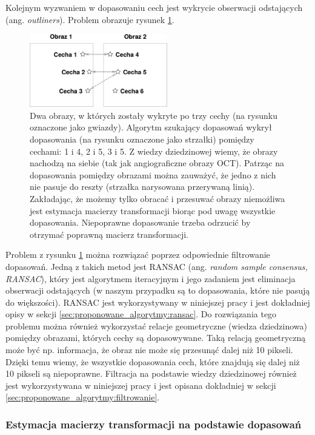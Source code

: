 Kolejnym wyzwaniem w dopasowaniu cech jest wykrycie obserwacji odstających (ang. \textit{outliners}). Problem obrazuje rysunek \ref{fig:algorytmy_korejestracji:outliners}.

\begin{figure}[H]
  \centering
  \includegraphics[width=6cm]{gfx/match}
  \caption{Dwa obrazy, w których zostały wykryte po trzy cechy (na rysunku oznaczone jako gwiazdy). Algorytm szukający dopasowań wykrył dopasowania (na rysunku oznaczone jako strzałki) pomiędzy cechami: 1 i 4, 2 i 5, 3 i 5. Z wiedzy dziedzinowej wiemy, że obrazy nachodzą na siebie (tak jak angiograficzne obrazy OCT). Patrząc na dopasowania pomiędzy obrazami można zauważyć, że jedno z nich nie pasuje do reszty (strzałka narysowana przerywaną linią). Zakładając, że możemy tylko obracać i przesuwać obrazy niemożliwa jest estymacja macierzy transformacji biorąc pod uwagę wszystkie dopasowania. Niepoprawne dopasowanie trzeba odrzucić by otrzymać poprawną macierz transformacji.}
  \label{fig:algorytmy_korejestracji:outliners}
\end{figure}

Problem z rysunku \ref{fig:algorytmy_korejestracji:outliners} można rozwiązać poprzez odpowiednie filtrowanie dopasowań. Jedną z takich metod jest RANSAC (ang. \textit{random sample consensus, RANSAC}), który jest algorytmem iteracyjnym i jego zadaniem jest eliminacja obserwacji odstających (w naszym przypadku są to dopasowania, które nie pasują do większości). RANSAC jest wykorzystywany w niniejszej pracy i jest dokładniej opisy w sekcji \ref{sec:proponowane_algorytmy:ransac}. Do rozwiązania tego problemu można również wykorzystać relacje geometryczne (wiedza dziedzinowa) pomiędzy obrazami, których cechy są dopasowywane. Taką relacją geometryczną może być np. informacja, że obraz nie może się przesunąć dalej niż 10 pikseli. Dzięki temu wiemy, że wszystkie dopasowania cech, które znajdują się dalej niż 10 pikseli są niepoprawne. Filtracja na podstawie wiedzy dziedzinowej również jest wykorzystywana w niniejszej pracy i jest opisana dokładniej w sekcji \ref{sec:proponowane_algorytmy:filtrowanie}.

\subsubsection{Estymacja macierzy transformacji na podstawie dopasowań}

